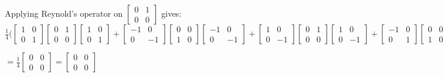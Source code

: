 \documentclass[a4paper]{article}
\begin{document}
Applying Reynold's operator on $\begin{bmatrix} 0 & 1 \\ 0 & 0 \end{bmatrix}$ gives:\\
$    \frac{1}{4} \Bigg(\begin{bmatrix} 1 & 0 \\ 0 & 1 \end{bmatrix} \begin{bmatrix} 0 & 1 \\ 0 & 0\end{bmatrix} \begin{bmatrix} 1 & 0 \\ 0 & 1 \end{bmatrix} + 
\begin{bmatrix} -1 & 0 \\ 0 & -1 \end{bmatrix} \begin{bmatrix} 0 & 0 \\ 1 & 0\end{bmatrix} \begin{bmatrix} -1 & 0 \\ 0 & -1 \end{bmatrix} +  
\begin{bmatrix} 1 & 0 \\ 0 & -1 \end{bmatrix} \begin{bmatrix} 0 & 1 \\ 0 & 0\end{bmatrix} \begin{bmatrix} 1 & 0 \\ 0 & -1 \end{bmatrix} + 
\begin{bmatrix} -1 & 0 \\ 0 & 1 \end{bmatrix} \begin{bmatrix} 0 & 0 \\ 1 & 0\end{bmatrix} \begin{bmatrix} -1 & 0 \\ 0 & 1 \end{bmatrix} \Bigg)$\\
\begin{center}
$= \frac{1}{4}\begin{bmatrix} 0 & 0 \\ 0 & 0 \end{bmatrix} = \begin{bmatrix} 0 & 0 \\ 0 & 0 \end{bmatrix} $
\end{center}
\end{document}
